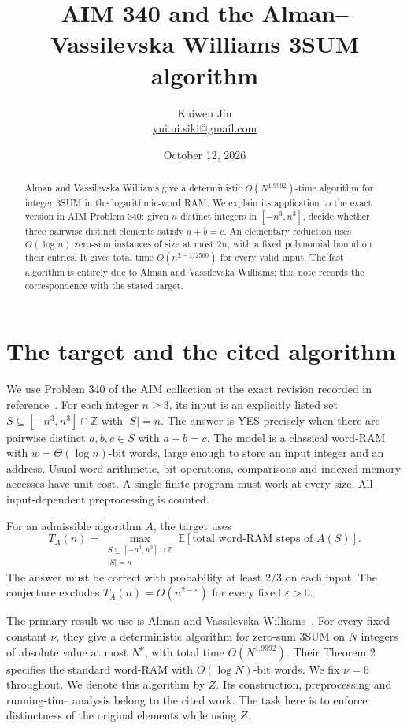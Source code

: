\documentclass[11pt]{article}
\title{AIM 340 and the Alman--Vassilevska Williams 3SUM algorithm}
\author{Kaiwen Jin\\\small\href{mailto:yui.ui.siki@gmail.com}{yui.ui.siki@gmail.com}}
\date{October 12, 2026}
\begin{document}
\maketitle

\begin{abstract}
Alman and Vassilevska Williams give a deterministic
$O(N^{1.9992})$-time algorithm for integer 3SUM in the logarithmic-word
RAM. We explain its application to the exact version in AIM Problem 340:
given $n$ distinct integers in $[-n^3,n^3]$, decide whether three pairwise
distinct elements satisfy $a+b=c$. An elementary reduction uses
$O(\log n)$ zero-sum instances of size at most $2n$, with a fixed
polynomial bound on their entries. It gives total time
$O(n^{2-1/2500})$ for every valid input.
The fast algorithm is entirely due to Alman and Vassilevska Williams;
this note records the correspondence with the stated target.
\end{abstract}

\section{The target and the cited algorithm}\label{sec:target}

We use Problem 340 of the AIM collection at the exact revision
recorded in reference~\cite{aim}.
For each integer $n\geq3$, its input is an explicitly listed set
$S\subseteq[-n^3,n^3]\cap\mathbb Z$ with $|S|=n$.
The answer is YES precisely when there are pairwise distinct
$a,b,c\in S$ with $a+b=c$.
The model is a classical word-RAM with $w=\Theta(\log n)$-bit words,
large enough to store an input integer and an address.
Usual word arithmetic, bit operations, comparisons and indexed memory
accesses have unit cost. A single finite program must work at every size.
All input-dependent preprocessing is counted.

For an admissible algorithm $A$, the target uses
\[
 T_A(n)=
 \max_{\substack{S\subseteq[-n^3,n^3]\cap\mathbb Z\\|S|=n}}
 \mathbb E[\text{total word-RAM steps of }A(S)].
\]
The answer must be correct with probability at least $2/3$ on each input.
The conjecture excludes $T_A(n)=O(n^{2-\varepsilon})$ for every fixed
$\varepsilon>0$.

The primary result we use is Alman and Vassilevska
Williams~\cite[Theorem 22, Section 3.4]{avw}.
For every fixed constant $\nu$, they give a deterministic algorithm for
zero-sum 3SUM on $N$ integers of absolute value at most $N^\nu$,
with total time $O(N^{1.9992})$.
Their Theorem 2 specifies the standard word-RAM with $O(\log N)$-bit
words. We fix $\nu=6$ throughout.
We denote this algorithm by $Z$.
Its construction, preprocessing and running-time analysis belong to
the cited work. The task here is to enforce distinctness of the
original elements while using $Z$.
\end{document}
